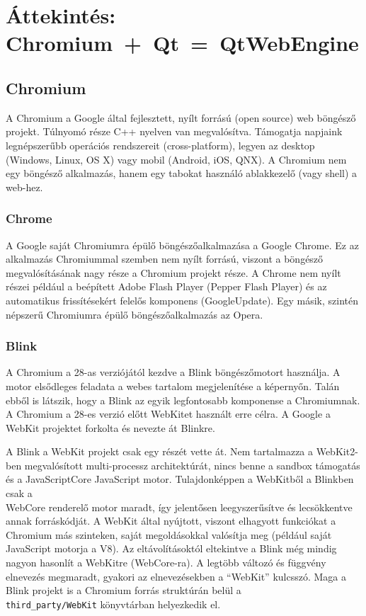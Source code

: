 \documentclass[12pt]{report}
\begin{document}
\chapter{Áttekintés: \mbox{Chromium + Qt = QtWebEngine}}

\section{Chromium}
A Chromium a Google által fejlesztett, nyílt forrású (open source) web böngésző projekt.
Túlnyomó része C++ nyelven van megvalósítva. Támogatja napjaink legnépszerűbb operációs
rendszereit (cross-platform), legyen az desktop (Windows, Linux, OS X) vagy mobil
(Android, iOS, QNX).
A Chromium nem egy böngésző alkalmazás, hanem egy tabokat használó ablakkezelő (vagy shell)
a web-hez.
\cite{bib:wiki-chromium}

\subsection{Chrome}
A Google saját Chromiumra épülő böngészőalkalmazása a Google Chrome.
Ez az alkalmazás Chromiummal szemben nem nyílt forrású, viszont a böngésző
megvalósításának nagy része a Chromium projekt része.
A Chrome nem nyílt részei például a beépített Adobe Flash Player (Pepper Flash Player)
és az automatikus frissítésekért felelős komponens (GoogleUpdate). \cite{bib:wiki-chrome}
Egy másik, szintén népszerű Chromiumra épülő böngészőalkalmazás az Opera.

\subsection{Blink}
A Chromium a 28-as verziójától kezdve a Blink böngészőmotort használja.
A motor elsődleges feladata a webes tartalom megjelenítése a képernyőn. Talán
ebből is látszik, hogy a Blink az egyik legfontosabb komponense a Chromiumnak.
A Chromium a 28-es verzió előtt WebKitet használt erre célra. A Google a WebKit projektet
forkolta és nevezte át Blinkre.
\cite{bib:wiki-blink}

A Blink a WebKit projekt csak egy részét vette át. Nem tartalmazza a WebKit2-ben megvalósított
multi-processz architektúrát, nincs benne a sandbox támogatás és a JavaScriptCore JavaScript
motor. Tulajdonképpen a WebKitből a Blinkben csak a \\
WebCore renderelő motor maradt, így jelentősen leegyszerűsítve és lecsökkentve annak
forráskódját. A WebKit által nyújtott, viszont elhagyott funkciókat a Chromium más szinteken,
saját megoldásokkal valósítja meg (például saját JavaScript motorja a V8). Az eltávolításoktól
eltekintve a Blink még mindig nagyon hasonlít a WebKitre (WebCore-ra). A legtöbb változó és
függvény elnevezés megmaradt, gyakori az elnevezésekben a ``WebKit'' kulcsszó. Maga a Blink
projekt is a Chromium forrás struktúrán belül a \\
\texttt{third\_party/WebKit} könyvtárban helyezkedik el.
\cite{bib:chromium-displays-web-pages, bib:chromium-blink}
\end{document}
